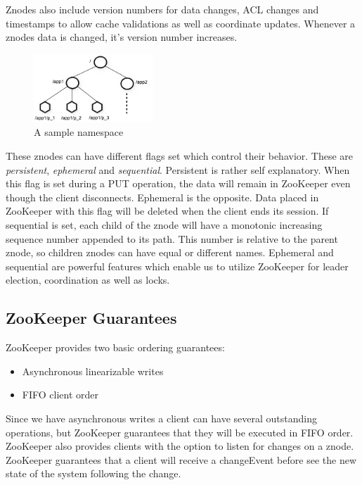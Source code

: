 Znodes also include version numbers for data changes, ACL changes and timestamps to allow cache validations as well as coordinate updates. Whenever a znodes data is changed, it's version number increases.

\begin{figure}[h]
    \centering
    \includegraphics[width=0.4\textwidth]{software/zknamespace.jpg}
    \caption{A sample namespace}
    \label{fig:zk_namespace}
\end{figure}

These znodes can have different flags set which control their behavior. These are \emph{persistent}, \emph{ephemeral} and \emph{sequential}. Persistent is rather self explanatory. When this flag is set during a PUT operation, the data will remain in ZooKeeper even though the client disconnects. Ephemeral is the opposite. Data placed in ZooKeeper with this flag will be deleted when the client ends its session. If sequential is set, each child of the znode will have a monotonic increasing sequence number appended to its path. This number is relative to the parent znode, so children znodes can have equal or different names. Ephemeral and sequential are powerful features which enable us to utilize ZooKeeper for leader election, coordination as well as locks. 

\subsection{ZooKeeper Guarantees}
ZooKeeper provides two basic ordering guarantees:

\begin{itemize}
	\item Asynchronous linearizable writes
 	\item FIFO client order
\end{itemize}

Since we have asynchronous writes a client can have several outstanding operations, but ZooKeeper guarantees that they will be executed in FIFO order. ZooKeeper also provides clients with the option to listen for changes on a znode. ZooKeeper guarantees that a client will receive a changeEvent before see the new state of the system following the change. 


